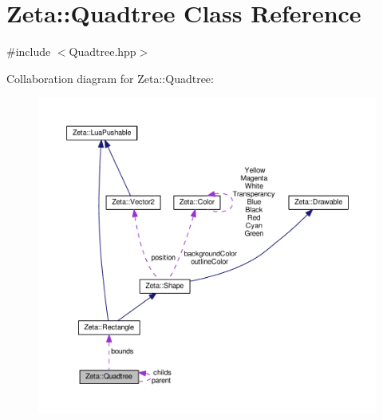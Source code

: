 \hypertarget{classZeta_1_1Quadtree}{\section{Zeta\+:\+:Quadtree Class Reference}
\label{classZeta_1_1Quadtree}
}


{\ttfamily \#include $<$Quadtree.\+hpp$>$}



Collaboration diagram for Zeta\+:\+:Quadtree\+:\nopagebreak
\begin{figure}[H]
\begin{center}
\leavevmode
\includegraphics[width=350pt]{classZeta_1_1Quadtree__coll__graph}
\end{center}
\end{figure}
